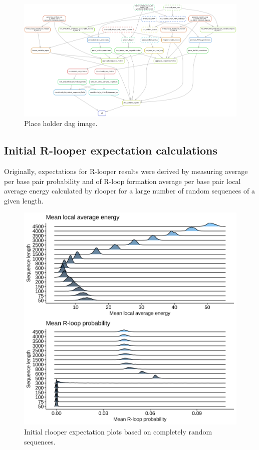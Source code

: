 \documentclass[11pt]{article}
\begin{document}
\begin{figure}[H]
	\includegraphics[width=15cm]{images/misc/dag.png}
	\centering
	\caption{Place holder dag image.}
\end{figure}

\subsection{Initial R-looper expectation calculations}

Originally, expectations for R-looper results were derived by measuring average per base pair probability and of R-loop formation average per base pair local average energy calculated by rlooper for a large number of random sequences of a given length. 

\begin{figure}[H]
	\includegraphics[width=15cm]{images/plots/rand_seq_LAE_dist.png}
	\centering
	\caption{Initial rlooper expectation plots based on completely random sequences.}
\end{figure}
\end{document}
